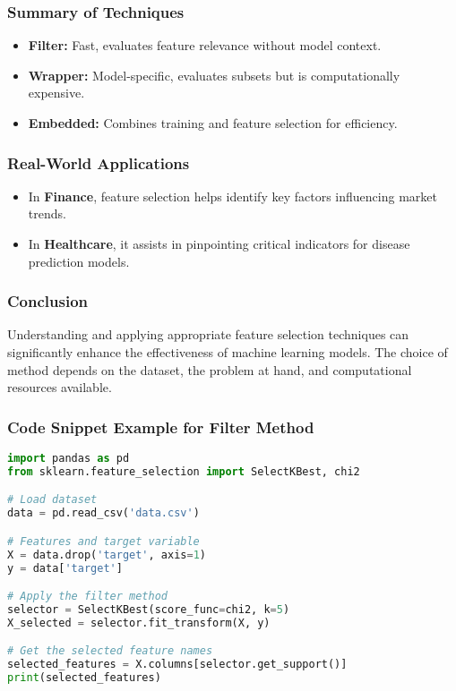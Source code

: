 \documentclass[aspectratio=169]{beamer}
\begin{document}
\begin{frame}[fragile]
    \frametitle{Summary of Techniques}
    \begin{itemize}
        \item \textbf{Filter:} Fast, evaluates feature relevance without model context.
        \item \textbf{Wrapper:} Model-specific, evaluates subsets but is computationally expensive.
        \item \textbf{Embedded:} Combines training and feature selection for efficiency.
    \end{itemize}
\end{frame}

\begin{frame}[fragile]
    \frametitle{Real-World Applications}
    \begin{itemize}
        \item In \textbf{Finance}, feature selection helps identify key factors influencing market trends.
        \item In \textbf{Healthcare}, it assists in pinpointing critical indicators for disease prediction models.
    \end{itemize}
\end{frame}

\begin{frame}[fragile]
    \frametitle{Conclusion}
    Understanding and applying appropriate feature selection techniques can significantly enhance the effectiveness of machine learning models.
    The choice of method depends on the dataset, the problem at hand, and computational resources available.
\end{frame}

\begin{frame}[fragile]
    \frametitle{Code Snippet Example for Filter Method}
    \begin{lstlisting}[language=Python]
import pandas as pd
from sklearn.feature_selection import SelectKBest, chi2

# Load dataset
data = pd.read_csv('data.csv')

# Features and target variable
X = data.drop('target', axis=1)
y = data['target']

# Apply the filter method
selector = SelectKBest(score_func=chi2, k=5)
X_selected = selector.fit_transform(X, y)

# Get the selected feature names
selected_features = X.columns[selector.get_support()]
print(selected_features)
    \end{lstlisting}
\end{frame}
\end{document}

